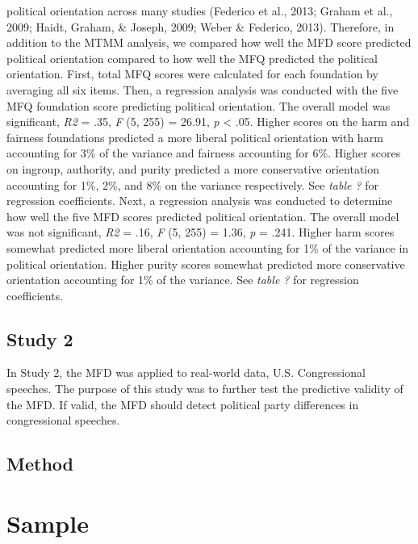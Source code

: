 \documentclass[english,man]{apa6}
\newcounter{author}
\theoremstyle{definition}
\theoremstyle{definition}
\theoremstyle{definition}
\theoremstyle{remark}
\begin{document}
political orientation across many studies (Federico et al., 2013; Graham
et al., 2009; Haidt, Graham, \& Joseph, 2009; Weber \& Federico, 2013).
Therefore, in addition to the MTMM analysis, we compared how well the
MFD score predicted political orientation compared to how well the MFQ
predicted the political orientation. First, total MFQ scores were
calculated for each foundation by averaging all six items. Then, a
regression analysis was conducted with the five MFQ foundation score
predicting political orientation. The overall model was significant,
\emph{R2} = .35, \emph{F} (5, 255) = 26.91, \emph{p} \textless{} .05.
Higher scores on the harm and fairness foundations predicted a more
liberal political orientation with harm accounting for 3\% of the
variance and fairness accounting for 6\%. Higher scores on ingroup,
authority, and purity predicted a more conservative orientation
accounting for 1\%, 2\%, and 8\% on the variance respectively. See
\emph{table ?} for regression coefficients. Next, a regression analysis
was conducted to determine how well the five MFD scores predicted
political orientation. The overall model was not significant, \emph{R2}
= .16, \emph{F} (5, 255) = 1.36, \emph{p} = .241. Higher harm scores
somewhat predicted more liberal orientation accounting for 1\% of the
variance in political orientation. Higher purity scores somewhat
predicted more conservative orientation accounting for 1\% of the
variance. See \emph{table ?} for regression coefficients.

\subsection{Study 2}\label{study-2}

In Study 2, the MFD was applied to real-world data, U.S. Congressional
speeches. The purpose of this study was to further test the predictive
validity of the MFD. If valid, the MFD should detect political party
differences in congressional speeches.

\subsection{Method}\label{method-1}

\section{Sample}\label{sample}
\end{document}
